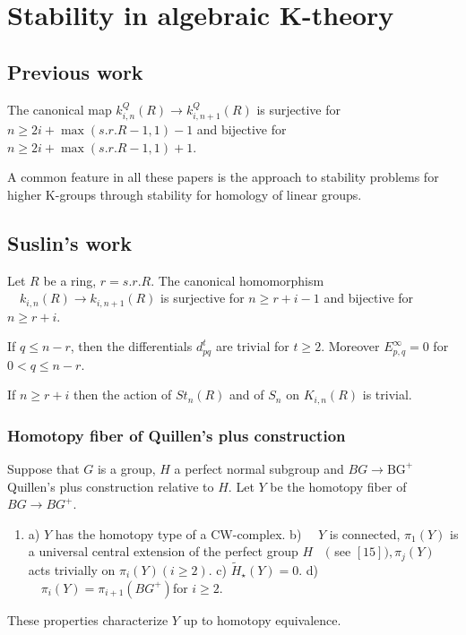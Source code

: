\chapter*{Stability in algebraic K-theory}


\section{Previous work}
\begin{theo}
    The canonical map $k_{i, n}^Q(R) \rightarrow k_{i, n+1}^Q(R)$ is surjective for $n \geq 2 i+\max (s . r . R-1,1)-1$ and bijective for $n \geq 2 i+\max (s . r . R-1,1)+1$. 
\end{theo}
A common feature in all these papers is the approach to stability problems for higher K-groups through stability for homology of linear groups.


\section{Suslin's work}
\cite{suslinStabilityAlgebraicKtheory1982} 

\begin{theo}
    Let $R$ be a ring, $r=s . r . R$. The canonical homomorphism $\quad k_{i, n}(R) \rightarrow k_{i, n+1}(R)$ is surjective for $n \geq r+i-1$ and bijective for $n \geq r+i$.    
    \end{theo}

 \begin{prop}
If $q \leq n-r$, then the differentials $d_{p q}^t$ are trivial for $t \geq 2$. Moreover $E_{p, q}^{\infty}=0$ for $0<q \leq n-r$.
 \end{prop}   

 \begin{coro}
    If $n \geq r+i$ then the action of $S t_n(R)$ and of $S_n$ on $K_{i, n}(R)$ is trivial.
 \end{coro}

\subsection{Homotopy fiber of Quillen's plus construction}

Suppose that $G$ is a group, $H$ a perfect normal subgroup and $B G \rightarrow \mathrm{BG}^{+}$Quillen's plus construction relative to $H$. Let $Y$ be the homotopy fiber of $B G \rightarrow B G^{+}$.

\begin{lemm}
    \begin{enumerate}
        \item a) $Y$ has the homotopy type of a CW-complex.
        b) $\quad Y$ is connected, $\pi_1(Y)$ is a universal central extension of the perfect group $H \quad($ see $[15]), \pi_j(Y)$ acts trivially on $\pi_i(Y)(i \geq 2)$.
        c) $\tilde{H}_{\star}(Y)=0$.
        d) $\quad \pi_i(Y)=\pi_{i+1}\left(B G^{+}\right)$for $i \geq 2$.
    \end{enumerate}
    These properties characterize $Y$ up to homotopy equivalence.
\end{lemm}



